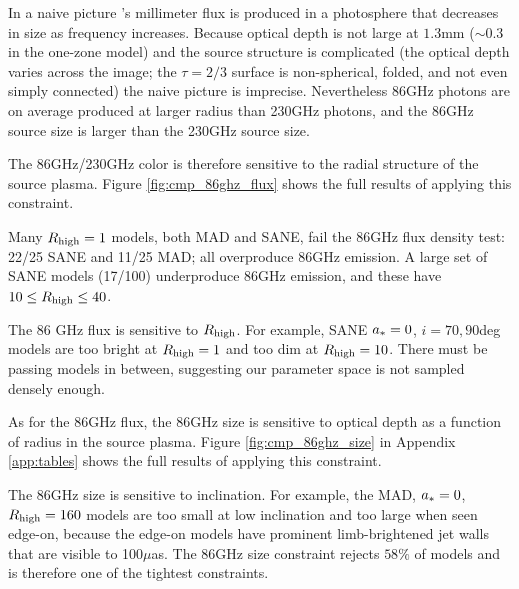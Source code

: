 
In a naive picture \sgra's millimeter flux is produced in a photosphere that decreases in size as frequency increases.  Because optical depth is not large at $1.3$mm ($\sim 0.3$ in the one-zone model) and the source structure is complicated (the optical depth varies across the image; the $\tau = 2/3$ surface is non-spherical, folded, and not even simply connected) the naive picture is imprecise.  Nevertheless 86GHz photons are on average produced at larger radius than 230GHz photons, and the 86GHz source size is larger than the 230GHz source size.

The 86GHz/230GHz color is therefore sensitive to the radial structure of the source plasma.  Figure \ref{fig:cmp_86ghz_flux} shows the full results of applying this constraint.


Many $R_\mathrm{high} = 1$ models, both MAD and SANE, fail the $86$GHz flux density test: 22/25 SANE and 11/25 MAD; all overproduce $86$GHz emission.  A large set of SANE models (17/100) underproduce $86$GHz emission, and these have $10 \le R_\mathrm{high} \le 40$.

The 86 GHz flux is sensitive to $R_\mathrm{high}$.  For example, SANE $a_* = 0$, $i = 70,90$deg models are too bright at $R_\mathrm{high} = 1$ and too dim at $R_\mathrm{high} = 10$.  There must be passing models in between, suggesting our parameter space is not sampled densely enough.



As for the $86$GHz flux, the $86$GHz size is sensitive to optical depth as a function of radius in the source plasma. Figure \ref{fig:cmp_86ghz_size} in Appendix \ref{app:tables} shows the full results of applying this constraint.


The 86GHz size is sensitive to inclination.  For example, the MAD, $a_* = 0$, $R_\mathrm{high} = 160$ models are too small at low inclination and too large when seen edge-on, because the edge-on models have prominent limb-brightened jet walls that are visible to 100$\mu$as.  The 86GHz size constraint rejects
$58\%$ of models and is therefore one of the tightest constraints.

